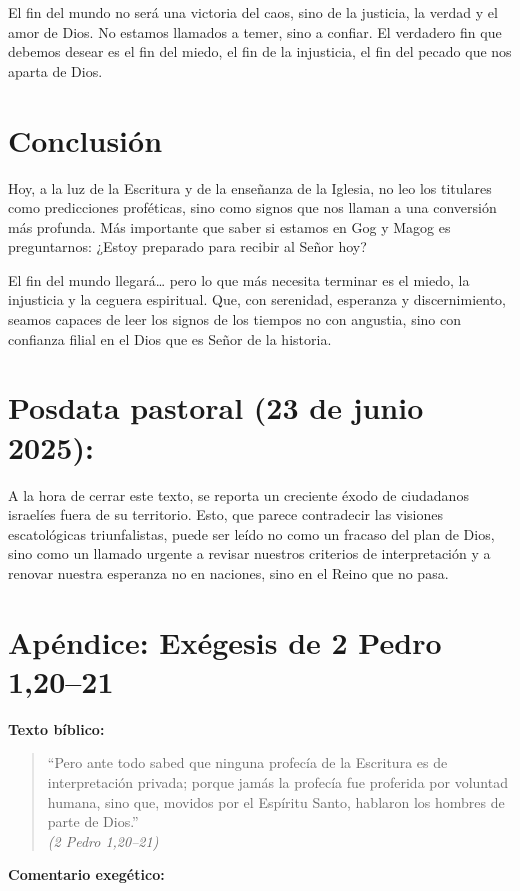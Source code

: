 \documentclass[12pt]{article}
\begin{document}
El fin del mundo no será una victoria del caos, sino de la justicia, la verdad y el amor de Dios. No estamos llamados a temer, sino a confiar. El verdadero fin que debemos desear es el fin del miedo, el fin de la injusticia, el fin del pecado que nos aparta de Dios.

\section*{Conclusión}
Hoy, a la luz de la Escritura y de la enseñanza de la Iglesia, no leo los titulares como predicciones proféticas, sino como signos que nos llaman a una conversión más profunda. Más importante que saber si estamos en Gog y Magog es preguntarnos: ¿Estoy preparado para recibir al Señor hoy?

El fin del mundo llegará… pero lo que más necesita terminar es el miedo, la injusticia y la ceguera espiritual. Que, con serenidad, esperanza y discernimiento, seamos capaces de leer los signos de los tiempos no con angustia, sino con confianza filial en el Dios que es Señor de la historia.

\section*{Posdata pastoral (23 de junio 2025):}
A la hora de cerrar este texto, se reporta un creciente éxodo de ciudadanos israelíes fuera de su territorio. Esto, que parece contradecir las visiones escatológicas triunfalistas, puede ser leído no como un fracaso del plan de Dios, sino como un llamado urgente a revisar nuestros criterios de interpretación y a renovar nuestra esperanza no en naciones, sino en el Reino que no pasa.

\newpage

\section*{Apéndice: Exégesis de 2 Pedro 1,20--21}

\textbf{Texto bíblico:}

\begin{quote}
“Pero ante todo sabed que ninguna profecía de la Escritura es de interpretación privada; porque jamás la profecía fue proferida por voluntad humana, sino que, movidos por el Espíritu Santo, hablaron los hombres de parte de Dios.” \\ \emph{(2 Pedro 1,20–21)}
\end{quote}

\textbf{Comentario exegético:}
\end{document}
